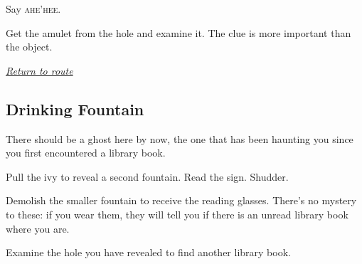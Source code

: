 \documentclass[a5paper]{extarticle}
\begin{document}
\begin{adjustbox}{center}
\end{adjustbox}

Say \textsc{ahe'hee}.

Get the amulet from the hole and examine it.
The clue is more important than the object.

\hyperref[sec:route-7]{\emph{Return to route}}

\newpage
\subsection{Drinking Fountain}\label{sec:sol-Drinking-Fountain}

There should be a ghost here by now, the one that has been haunting you since
you first encountered a library book.

Pull the ivy to reveal a second fountain. Read the sign. Shudder.

Demolish the smaller fountain to receive the reading glasses.
There's no mystery to these: if you wear them,
they will tell you if there is an unread library book where you are.

Examine the hole you have revealed to find another library book.
\end{document}
